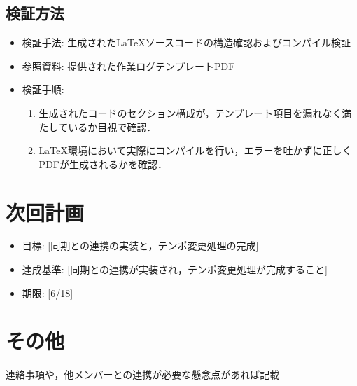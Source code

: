 \documentclass[uplatex,dvipdfmx]{jlreq}
\begin{document}
\subsection{検証方法}
\begin{itemize}
    \item  検証手法: 生成された\LaTeX ソースコードの構造確認およびコンパイル検証
    \item  参照資料: 提供された作業ログテンプレートPDF
    \item  検証手順:
    \begin{enumerate}
        \item 生成されたコードのセクション構成が，テンプレート項目を漏れなく満たしているか目視で確認．
        \item \LaTeX 環境において実際にコンパイルを行い，エラーを吐かずに正しくPDFが生成されるかを確認．
    \end{enumerate}
\end{itemize}

\section{次回計画}
\begin{itemize}
    \item  目標: [同期との連携の実装と，テンポ変更処理の完成]
    \item  達成基準: [同期との連携が実装され，テンポ変更処理が完成すること]
    \item  期限: [6/18]
\end{itemize}

\section{その他}
連絡事項や，他メンバーとの連携が必要な懸念点があれば記載
\end{document}
